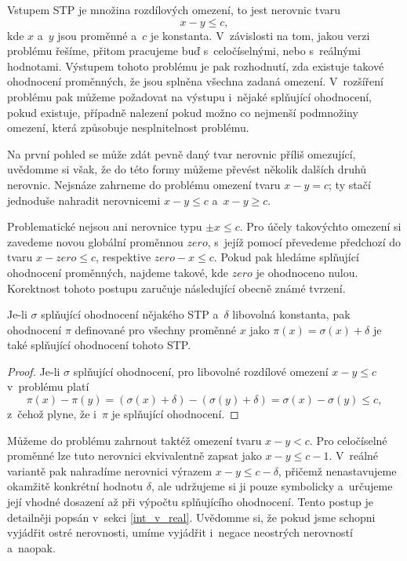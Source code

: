 Vstupem STP je množina rozdílových omezení, to jest nerovnic tvaru $$x - y \leq c,$$ kde $x$ a~$y$ jsou proměnné a~$c$ je konstanta. V~závislosti na tom, jakou verzi problému řešíme, přitom pracujeme buď s~celočíselnými, nebo s~reálnými hodnotami. Výstupem tohoto problému je pak rozhodnutí, zda existuje takové ohodnocení proměnných, že jsou splněna všechna zadaná omezení. V~rozšíření problému pak můžeme požadovat na výstupu i~nějaké splňující ohodnocení, pokud existuje, případně nalezení pokud možno co nejmenší podmnožiny omezení, která způsobuje nesplnitelnost problému.

Na první pohled se může zdát pevně daný tvar nerovnic příliš omezující, uvědomme si však, že do této formy můžeme převést několik dalších druhů nerovnic. Nejsnáze zahrneme do problému omezení tvaru $x - y = c$; ty stačí jednoduše nahradit nerovnicemi $x - y \leq c$ a~$x - y \geq c$.

Problematické nejsou ani nerovnice typu $\pm x \leq c$. Pro účely takovýchto omezení si zavedeme novou globální proměnnou $zero$, s~jejíž pomocí převedeme předchozí do tvaru $x - zero \leq c$, respektive $zero - x \leq c$. Pokud pak hledáme splňující ohodnocení proměnných, najdeme takové, kde $zero$ je ohodnoceno nulou. Korektnost tohoto postupu zaručuje následující obecně známé tvrzení.

\begin{tvrz}\label{tvr:posun}
	Je-li $\sigma$ splňující ohodnocení nějakého STP a~$\delta$ libovolná konstanta, pak ohodnocení $\pi$ definované pro všechny proměnné $x$ jako $\pi(x) = \sigma(x) + \delta$ je také splňující ohodnocení tohoto STP.
\end{tvrz}
\begin{proof}
	Je-li $\sigma$ splňující ohodnocení, pro libovolné rozdílové omezení $x-y \leq c$ v~problému platí $$\pi(x) - \pi(y) = (\sigma(x) + \delta) - (\sigma(y) + \delta) = \sigma(x) - \sigma(y) \leq c,$$ z~čehož plyne, že i~$\pi$ je splňující ohodnocení.
\end{proof}

Můžeme do problému zahrnout taktéž omezení tvaru $x - y < c$. Pro celočíselné proměnné lze tuto nerovnici ekvivalentně zapsat jako $x - y \leq c-1$. V~reálné variantě pak nahradíme nerovnici výrazem $x - y \leq c - \delta$, přičemž nenastavujeme okamžitě konkrétní hodnotu $\delta$, ale udržujeme si ji pouze symbolicky a~určujeme její vhodné dosazení až při výpočtu splňujícího ohodnocení. Tento postup je detailněji popsán v~sekci \ref{int_v_real}. Uvědomme si, že pokud jsme schopni vyjádřit ostré nerovnosti, umíme vyjádřit i~negace neostrých nerovností a~naopak.

